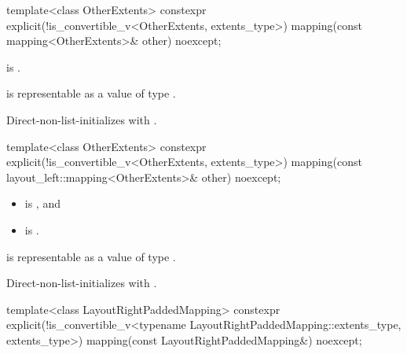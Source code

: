 %
\begin{itemdecl}
template<class OtherExtents>
  constexpr explicit(!is_convertible_v<OtherExtents, extents_type>)
    mapping(const mapping<OtherExtents>& other) noexcept;
\end{itemdecl}

\begin{itemdescr}
\pnum
\constraints
{} is .

\pnum
\expects
{} is representable as
a value of type .

\pnum
\effects
Direct-non-list-initializes  with .
\end{itemdescr}

%
\begin{itemdecl}
template<class OtherExtents>
  constexpr explicit(!is_convertible_v<OtherExtents, extents_type>)
    mapping(const layout_left::mapping<OtherExtents>& other) noexcept;
\end{itemdecl}

\begin{itemdescr}
\pnum
\constraints
\begin{itemize}
\item
{} is , and
\item
{} is .
\end{itemize}

\pnum
\expects
{} is representable as
a value of type .

\pnum
\effects
Direct-non-list-initializes  with .
\end{itemdescr}

%
\begin{itemdecl}
template<class LayoutRightPaddedMapping>
  constexpr explicit(!is_convertible_v<typename LayoutRightPaddedMapping::extents_type,
                                       extents_type>)
    mapping(const LayoutRightPaddedMapping&) noexcept;
\end{itemdecl}

